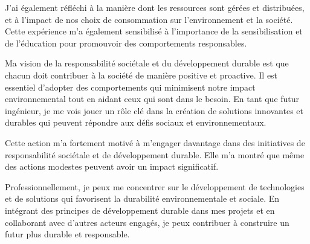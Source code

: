\documentclass[11pt, openright]{book}
\begin{document}
J'ai également réfléchi à la manière dont les ressources sont gérées et distribuées, et à l'impact de nos choix de consommation sur l'environnement et la société. Cette expérience m'a également sensibilisé à l'importance de la sensibilisation et de l'éducation pour promouvoir des comportements responsables.

Ma vision de la responsabilité sociétale et du développement durable est que chacun doit contribuer à la société de manière positive et proactive. Il est essentiel d'adopter des comportements qui minimisent notre impact environnemental tout en aidant ceux qui sont dans le besoin. En tant que futur ingénieur, je me vois jouer un rôle clé dans la création de solutions innovantes et durables qui peuvent répondre aux défis sociaux et environnementaux.

Cette action m'a fortement motivé à m'engager davantage dans des initiatives de responsabilité sociétale et de développement durable. Elle m'a montré que même des actions modestes peuvent avoir un impact significatif.

Professionnellement, je peux me concentrer sur le développement de technologies et de solutions qui favorisent la durabilité environnementale et sociale. En intégrant des principes de développement durable dans mes projets et en collaborant avec d'autres acteurs engagés, je peux contribuer à construire un futur plus durable et responsable.
\end{document}
